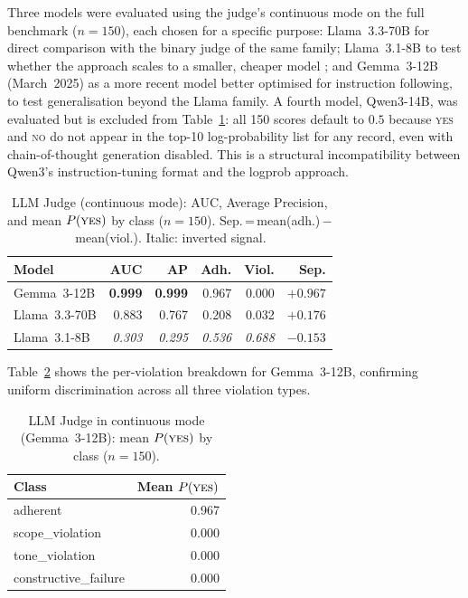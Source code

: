 \documentclass[11pt,a4paper]{article}
\begin{document}
Three models were evaluated using the judge's continuous mode on the full
benchmark ($n = 150$), each chosen for a specific purpose: Llama~3.3-70B
for direct comparison with the binary judge of the same family;
Llama~3.1-8B to test whether the approach scales to a smaller, cheaper
model \citep{dubey2024llama3}; and Gemma~3-12B
(March~2025) as a more recent model better optimised for instruction
following, to test generalisation beyond the Llama family. A fourth
model, Qwen3-14B, was evaluated but is excluded from
Table~\ref{tab:logprob_results}: all 150 scores default to $0.5$ because
\textsc{yes} and \textsc{no} do not appear in the top-10 log-probability
list for any record, even with chain-of-thought generation disabled. This
is a structural incompatibility between Qwen3's instruction-tuning format
and the logprob approach.

\begin{table}[ht]
  \centering
  \caption{LLM Judge (continuous mode): AUC, Average Precision, and mean
           $P(\textsc{yes})$ by class ($n = 150$).
           Sep.\,=\,mean(adh.)\,$-$\,mean(viol.).
           Italic: inverted signal.}
  \label{tab:logprob_results}
  \begin{tabular}{lrrrrr}
    \toprule
    \textbf{Model} & \textbf{AUC} & \textbf{AP} &
    \textbf{Adh.} & \textbf{Viol.} & \textbf{Sep.} \\
    \midrule
    Gemma~3-12B   & \textbf{0.999} & \textbf{0.999}
                  & 0.967 & 0.000 & $+0.967$ \\
    Llama~3.3-70B & 0.883 & 0.767
                  & 0.208 & 0.032 & $+0.176$ \\
    Llama~3.1-8B  & \textit{0.303} & \textit{0.295}
                  & \textit{0.536} & \textit{0.688} & $-0.153$ \\
    \bottomrule
  \end{tabular}
\end{table}

Table~\ref{tab:logprob_gemma_viol} shows the per-violation breakdown for
Gemma~3-12B, confirming uniform discrimination across all three violation
types.

\begin{table}[ht]
  \centering
  \caption{LLM Judge in continuous mode (Gemma~3-12B): mean
           $P(\textsc{yes})$ by class ($n = 150$).}
  \label{tab:logprob_gemma_viol}
  \begin{tabular}{lr}
    \toprule
    \textbf{Class} & \textbf{Mean $P(\textsc{yes})$} \\
    \midrule
    adherent              & 0.967 \\
    scope\_violation      & 0.000 \\
    tone\_violation       & 0.000 \\
    constructive\_failure & 0.000 \\
    \bottomrule
  \end{tabular}
\end{table}
\end{document}

